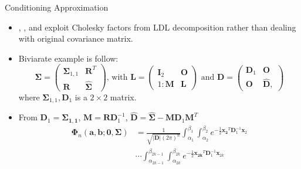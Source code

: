 \begin{frame}{Conditioning Approximation}
\begin{itemize}
	\item \citet{mendell1974multifactorial}, \citet{kamakura1989estimation}, and \citet{trinh2015bivariate} exploit Cholesky factors from LDL decomposition rather than dealing with original covariance matrix.
	\item Biviarate example is follow:
		$$\boldsymbol{\Sigma} = \begin{pmatrix}
		\boldsymbol{\Sigma}_{1,1} & \mathbf{R}^T\\
		\mathbf{R} & \hat{\boldsymbol{\Sigma}}
		\end{pmatrix}\text{, with } \mathbf{L}=\begin{pmatrix}
		\mathbf{I}_{2} & \mathbf{O}\\1:
		\mathbf{M} & \mathbf{L}
		\end{pmatrix}\text{ and } \mathbf{D}=\begin{pmatrix}
		\mathbf{D}_{1} & \mathbf{O}\\
		\mathbf{O} & \mathbf{\hat{D}},
		\end{pmatrix}$$
		where $\boldsymbol{\Sigma}_{1,1}, \mathbf{D}_{1}$ is a $2\times2$ matrix. 
		\item From $\mathbf{D}_1=\boldsymbol{\Sigma_{1,1}}$, $\mathbf{M}=\mathbf{R}\mathbf{D}_1^{-1}$, $\mathbf{\hat{D}}=\hat{\boldsymbol{\Sigma}}-\mathbf{M}\mathbf{D}_1\mathbf{M}^T$
		\begin{align}\label{eqn:phi_cond-biv}
		\boldsymbol{\Phi}_n(\mathbf{a},\mathbf{b};\mathbf{0},\boldsymbol{\Sigma})
		&= \frac{1}{\sqrt{\lvert\mathbf{D}\rvert(2\pi)^n}}\int_{\alpha_1}^{\beta_1}\int_{\alpha_2}^{\beta_2}e^{-\frac{1}{2}\mathbf{x_2}^T\mathbf{D}_1^{-1}\mathbf{x}_2}\nonumber\\
		&\cdots \int_{\alpha_{2k-1}}^{\beta_{2k-1}}\int_{\alpha_{2k}}^{\beta_{2k}}e^{-\frac{1}{2}\mathbf{x_{2k}}^T\mathbf{D}_1^{-1}\mathbf{x}_{2k}}
		\end{align}
	\end{itemize}
\end{frame}

